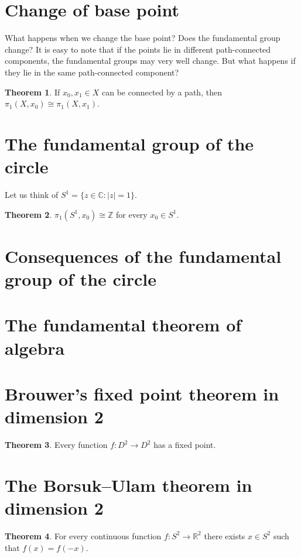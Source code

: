 \documentclass{book}
\theoremstyle{definition}
\newtheorem*{teo}{Theorem}
\newcommand{\R}{\mathbb{R}}
\newcommand{\Z}{\mathbb{Z}}
\newcommand{\C}{\mathbb{C}}
\begin{document}
\section{Change of base point}

What happens when we change the base point? Does the
fundamental group change? It is easy to note that if the
points lie in different path-connected components, the
fundamental groups may very well change. But what happens
if they lie in the same path-connected component?

\begin{teo}\label{teo:cambioptobase}
If $x_0,x_1\in X$ can be connected by a path, then
$\pi_1(X,x_0)\cong\pi_1(X,x_1)$.
\end{teo}

\section{The fundamental group of the circle}

Let us think of $S^1=\{z\in\C:|z|=1\}$.

\begin{teo}
$\pi_1(S^1,x_0)\cong\Z$ for every $x_0\in S^1$.
\end{teo}

\section{Consequences of the fundamental group of the circle}

\section{The fundamental theorem of algebra}

\section{Brouwer's fixed point theorem in dimension 2}

\begin{teo}
Every function $f:D^2\to D^2$ has a fixed point.
\end{teo}

\section{The Borsuk--Ulam theorem in dimension 2}

\begin{teo}
For every continuous function $f:S^2\to\R^2$ there exists
$x\in S^2$ such that $f(x)=f(-x)$.
\end{teo}
\end{document}
